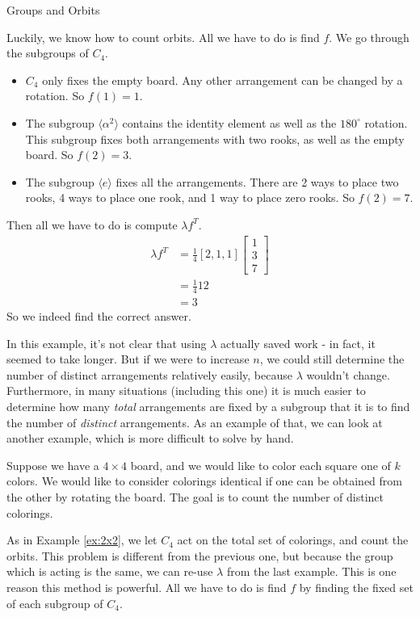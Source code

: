 \documentclass[12pt]{pom_thesis}
\begin{document}
\begin{chapter}{Groups and Orbits}
\begin{examp}
Luckily, we know how to count orbits. All we have to do is find $f$. We go through the subgroups of $C_4$.
\begin{itemize}
\item $C_4$ only fixes the empty board. Any other arrangement can be changed by a rotation. So $f(1) = 1$.
\item The subgroup $\langle \alpha^2 \rangle$ contains the identity element as well as the $180^\circ$ rotation. This subgroup fixes both arrangements with two rooks, as well as the empty board. So $f(2) = 3$.
\item The subgroup $\langle e \rangle$ fixes all the arrangements. There are 2 ways to place two rooks, 4 ways to place one rook, and 1 way to place zero rooks. So $f(2) = 7$.
\end{itemize}
Then all we have to do is compute $\lambda f^T$.
\begin{align*}
\lambda f^T &= \frac 14 [2, 1, 1] \begin{bmatrix} 1 \\ 3 \\ 7\end{bmatrix} \\
&= \frac 14 12\\
&=3
\end{align*}
So we indeed find the correct answer. 
\end{examp}

In this example, it's not clear that using $\lambda$ actually saved work - in fact, it seemed to take longer. But if we were to increase $n$, we could still determine the number of distinct arrangements relatively easily, because $\lambda$ wouldn't change. Furthermore, in many situations (including this one) it is much easier to determine how many \emph{total} arrangements are fixed by a subgroup that it is to find the number of \emph{distinct} arrangements. As an example of that, we can look at another example, which is more difficult to solve by hand. 
\begin{examp}
Suppose we have a $4 \times 4$ board, and we would like to color each square one of $k$ colors. We would like to consider colorings identical if one can be obtained from the other by rotating the board. The goal is to count the number of distinct colorings.

As in Example \ref{ex:2x2}, we let $C_4$ act on the total set of colorings, and count the orbits. This problem is different from the previous one, but because the group which is acting is the same, we can re-use $\lambda$ from the last example. This is one reason this method is powerful. All we have to do is find $f$ by finding the fixed set of each subgroup of $C_4$.


\end{examp}
\end{chapter}
\end{document}
